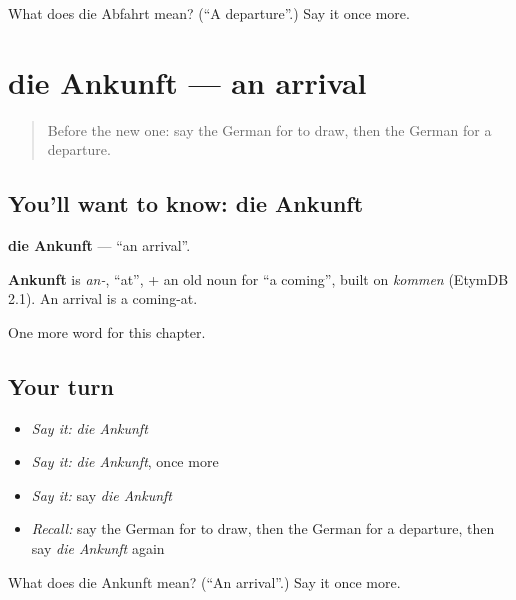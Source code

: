 \begin{tcolorbox}[breakable,colback=teal!4,colframe=teal!35!black,title={Before you move on}]
What does die Abfahrt mean? (\textquotedblleft{}A departure\textquotedblright{}.) Say it once more.
\end{tcolorbox}
\section[die Ankunft]{die Ankunft — an arrival}

\label{lesson:GE-C192-ankunft}



\begin{quote}
Before the new one: say the German for to draw, then the German for a departure.
\end{quote}

\subsection*{You'll want to know: die Ankunft}
\textbf{die Ankunft} — \textquotedblleft{}an arrival\textquotedblright{}.

\begin{cousinweb}
\textbf{Ankunft} is \emph{an-}, \textquotedblleft{}at\textquotedblright{}, + an old noun for \textquotedblleft{}a coming\textquotedblright{}, built on \emph{kommen} (EtymDB 2.1). An arrival is a coming-at.
\end{cousinweb}

\begin{grammarlens}[title={What you've built}]
One more word for this chapter.
\end{grammarlens}

\subsection*{Your turn}
\begin{itemize}
\raggedright
  \item \emph{Say it:} \emph{die Ankunft}
  \item \emph{Say it:} \emph{die Ankunft}, once more
  \item \emph{Say it:} say \emph{die Ankunft}
  \item \emph{Recall:} say the German for to draw, then the German for a departure, then say \emph{die Ankunft} again
\end{itemize}

\begin{tcolorbox}[breakable,colback=teal!4,colframe=teal!35!black,title={Before you move on}]
What does die Ankunft mean? (\textquotedblleft{}An arrival\textquotedblright{}.) Say it once more.
\end{tcolorbox}
